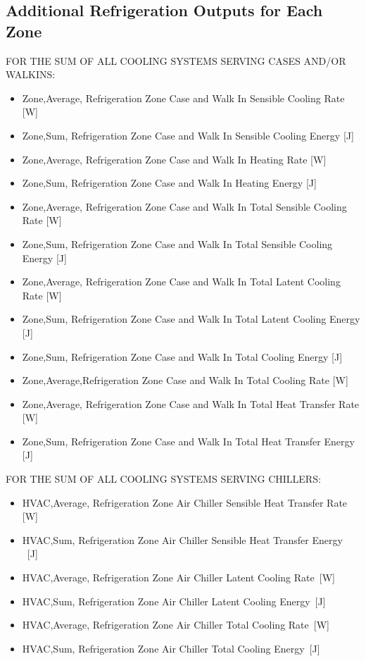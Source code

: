\subsection{Additional Refrigeration Outputs for Each Zone}\label{additional-refrigeration-outputs-for-each-zone}

FOR THE SUM OF ALL COOLING SYSTEMS SERVING CASES AND/OR WALKINS:

\begin{itemize}
\item
  Zone,Average, Refrigeration Zone Case and Walk In Sensible Cooling Rate {[}W{]}
\item
  Zone,Sum, Refrigeration Zone Case and Walk In Sensible Cooling Energy {[}J{]}
\item
  Zone,Average, Refrigeration Zone Case and Walk In Heating Rate {[}W{]}
\item
  Zone,Sum, Refrigeration Zone Case and Walk In Heating Energy {[}J{]}
\item
  Zone,Average, Refrigeration Zone Case and Walk In Total Sensible Cooling Rate {[}W{]}
\item
  Zone,Sum, Refrigeration Zone Case and Walk In Total Sensible Cooling Energy {[}J{]}
\item
  Zone,Average, Refrigeration Zone Case and Walk In Total Latent Cooling Rate {[}W{]}
\item
  Zone,Sum, Refrigeration Zone Case and Walk In Total Latent Cooling Energy {[}J{]}
\item
  Zone,Sum, Refrigeration Zone Case and Walk In Total Cooling Energy {[}J{]}
\item
  Zone,Average,Refrigeration Zone Case and Walk In Total Cooling Rate {[}W{]}
\item
  Zone,Average, Refrigeration Zone Case and Walk In Total Heat Transfer Rate {[}W{]}
\item
  Zone,Sum, Refrigeration Zone Case and Walk In Total Heat Transfer Energy {[}J{]}
\end{itemize}

FOR THE SUM OF ALL COOLING SYSTEMS SERVING CHILLERS:

\begin{itemize}
\item
  HVAC,Average, Refrigeration Zone Air Chiller Sensible Heat Transfer Rate {[}W{]}
\item
  HVAC,Sum, Refrigeration Zone Air Chiller Sensible Heat Transfer Energy ~{[}J{]}
\item
  HVAC,Average, Refrigeration Zone Air Chiller Latent Cooling Rate~{[}W{]}
\item
  HVAC,Sum, Refrigeration Zone Air Chiller Latent Cooling Energy~{[}J{]}
\item
  HVAC,Average, Refrigeration Zone Air Chiller Total Cooling Rate~{[}W{]}
\item
  HVAC,Sum, Refrigeration Zone Air Chiller Total Cooling Energy~{[}J{]}
\end{itemize}

